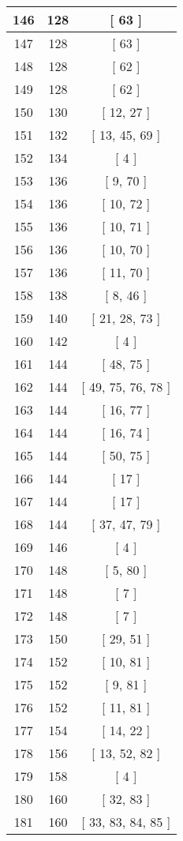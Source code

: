 \begin{center}
\begin{longtable}[H]{|| c c c ||}
\hline
146 & 128 & [ 63 ] \\ 
\hline
147 & 128 & [ 63 ] \\ 
\hline
148 & 128 & [ 62 ] \\ 
\hline
149 & 128 & [ 62 ] \\ 
\hline
150 & 130 & [ 12, 27 ] \\ 
\hline
151 & 132 & [ 13, 45, 69 ] \\ 
\hline
152 & 134 & [ 4 ] \\ 
\hline
153 & 136 & [ 9, 70 ] \\ 
\hline
154 & 136 & [ 10, 72 ] \\ 
\hline
155 & 136 & [ 10, 71 ] \\ 
\hline
156 & 136 & [ 10, 70 ] \\ 
\hline
157 & 136 & [ 11, 70 ] \\ 
\hline
158 & 138 & [ 8, 46 ] \\ 
\hline
159 & 140 & [ 21, 28, 73 ] \\ 
\hline
160 & 142 & [ 4 ] \\ 
\hline
161 & 144 & [ 48, 75 ] \\ 
\hline
162 & 144 & [ 49, 75, 76, 78 ] \\ 
\hline
163 & 144 & [ 16, 77 ] \\ 
\hline
164 & 144 & [ 16, 74 ] \\ 
\hline
165 & 144 & [ 50, 75 ] \\ 
\hline
166 & 144 & [ 17 ] \\ 
\hline
167 & 144 & [ 17 ] \\ 
\hline
168 & 144 & [ 37, 47, 79 ] \\ 
\hline
169 & 146 & [ 4 ] \\ 
\hline
170 & 148 & [ 5, 80 ] \\ 
\hline
171 & 148 & [ 7 ] \\ 
\hline
172 & 148 & [ 7 ] \\ 
\hline
173 & 150 & [ 29, 51 ] \\ 
\hline
174 & 152 & [ 10, 81 ] \\ 
\hline
175 & 152 & [ 9, 81 ] \\ 
\hline
176 & 152 & [ 11, 81 ] \\ 
\hline
177 & 154 & [ 14, 22 ] \\ 
\hline
178 & 156 & [ 13, 52, 82 ] \\ 
\hline
179 & 158 & [ 4 ] \\ 
\hline
180 & 160 & [ 32, 83 ] \\ 
\hline
181 & 160 & [ 33, 83, 84, 85 ] \\ 

\end{longtable}
\end{center}
